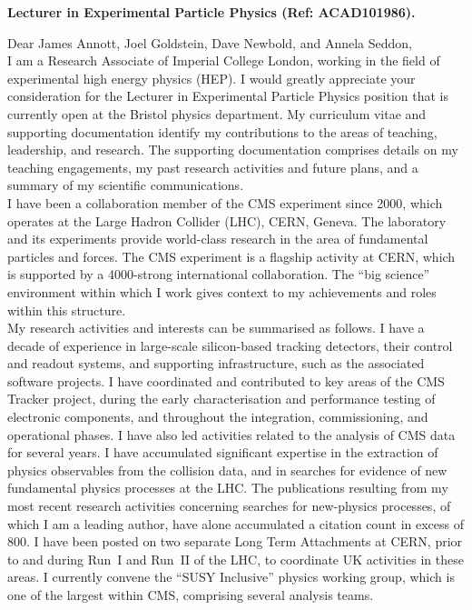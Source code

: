 
\begin{flushright}
\textbf{Lecturer in Experimental Particle Physics (Ref: ACAD101986).} \\
\end{flushright}

Dear James Annott, Joel Goldstein, Dave Newbold, and Annela Seddon, \\

I am a Research Associate of Imperial College London, working in the
field of experimental high energy physics (HEP). I would greatly
appreciate your consideration for the Lecturer in Experimental
Particle Physics position that is currently open at the Bristol
physics department. My curriculum vitae and supporting documentation
identify my contributions to the areas of teaching, leadership, and
research. The supporting documentation comprises details on my
teaching engagements, my past research activities and
future plans, and a summary of my scientific communications. \\

I have been a collaboration member of the CMS experiment since 2000,
which operates at the Large Hadron Collider (LHC), CERN, Geneva. The
laboratory and its experiments provide world-class research in the
area of fundamental particles and forces. The CMS experiment is a
flagship activity at CERN, which is supported by a 4000-strong
international collaboration. The ``big science'' environment within
which I work gives context to my achievements and roles within
this structure. \\

My research activities and interests can be summarised as follows. I
have a decade of experience in large-scale silicon-based tracking
detectors, their control and readout systems, and supporting
infrastructure, such as the associated software projects. I have
coordinated and contributed to key areas of the CMS Tracker project,
during the early characterisation and performance testing of
electronic components, and throughout the integration, commissioning,
and operational phases. I have also led activities related to the
analysis of CMS data for several years. I have accumulated significant
expertise in the extraction of physics observables from the collision
data, and in searches for evidence of new fundamental physics
processes at the LHC. The publications resulting from my most recent
research activities concerning searches for new-physics processes, of
which I am a leading author, have alone accumulated a citation count
in excess of 800. I have been posted on two separate Long Term
Attachments at CERN, prior to and during Run~I and Run~II of the LHC,
to coordinate UK activities in these areas. I currently convene the
``SUSY Inclusive'' physics working group, which is one of the largest
within CMS, comprising several analysis teams. \\

